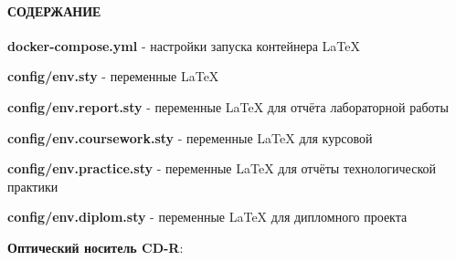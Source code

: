 \documentclass[12pt, a4paper, simple]{eskdtext}
\begin{document}
    

  \thispagestyle{plain}   %
  \pagestyle{plain}       %
  \hspace{0pt}

  \paragraph{СОДЕРЖАНИЕ} \hspace{0pt}

  \hspace{0pt}

  \textbf{docker-compose.yml} - настройки запуска контейнера LaTeX

  \textbf{config/env.sty} - переменные LaTeX

  \textbf{config/env.report.sty} - переменные LaTeX для отчёта лабораторной работы

  \textbf{config/env.coursework.sty} - переменные LaTeX для курсовой

  \textbf{config/env.practice.sty} - переменные LaTeX для отчёты технологической практики

  \textbf{config/env.diplom.sty} - переменные LaTeX для дипломного проекта

  \newpage

  \textbf{Оптический носитель CD-R}:
\end{document}
